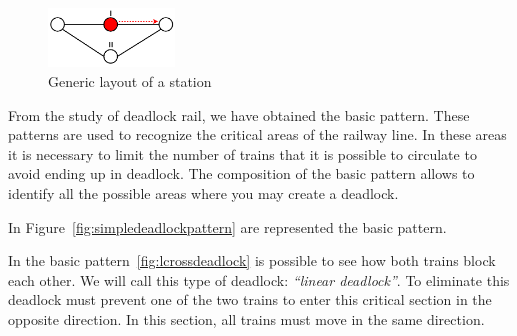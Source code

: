 \documentclass{ewic}
\begin{document}
\begin{figure}[htp]
	\begin{centering}	
	\includegraphics[width=0.3\textwidth, clip]{img/rappresentazione}
	\caption{Generic layout of a station}
	\label{fig:rappresent}
	\end{centering}
\end{figure}


From the study of deadlock rail, we have obtained the basic pattern.
These patterns are used to recognize the critical areas of the railway line. In these areas it is necessary to limit the number of trains that it is possible to circulate to avoid ending up in deadlock.
The composition of the basic pattern allows to identify all the possible areas where you may create a deadlock.

In Figure~\ref{fig:simpledeadlockpattern} are represented the basic pattern.


In the basic pattern~\ref{fig:lcrossdeadlock} is possible to see how both trains block each other. We will call this type of deadlock: \emph{``linear deadlock''}. To eliminate this deadlock must prevent one of the two trains to enter this critical section in the opposite direction. In this section, all trains must move in the same direction.

\end{document}
